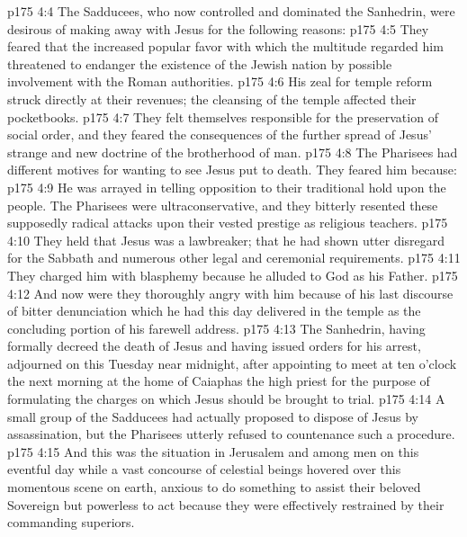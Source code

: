 \vs p175 4:4 The Sadducees, who now controlled and dominated the Sanhedrin, were desirous of making away with Jesus for the following reasons:
\pc \vs p175 4:5 \bibnobreakspace They feared that the increased popular favor with which the multitude regarded him threatened to endanger the existence of the Jewish nation by possible involvement with the Roman authorities.
\pc \vs p175 4:6 \bibnobreakspace His zeal for temple reform struck directly at their revenues; the cleansing of the temple affected their pocketbooks.
\pc \vs p175 4:7 \bibnobreakspace They felt themselves responsible for the preservation of social order, and they feared the consequences of the further spread of Jesus’ strange and new doctrine of the brotherhood of man.
\pc \vs p175 4:8 The Pharisees had different motives for wanting to see Jesus put to death. They feared him because:
\pc \vs p175 4:9 \bibnobreakspace He was arrayed in telling opposition to their traditional hold upon the people. The Pharisees were ultraconservative, and they bitterly resented these supposedly radical attacks upon their vested prestige as religious teachers.
\pc \vs p175 4:10 \bibnobreakspace They held that Jesus was a lawbreaker; that he had shown utter disregard for the Sabbath and numerous other legal and ceremonial requirements.
\pc \vs p175 4:11 \bibnobreakspace They charged him with blasphemy because he alluded to God as his Father.
\pc \vs p175 4:12 \bibnobreakspace And now were they thoroughly angry with him because of his last discourse of bitter denunciation which he had this day delivered in the temple as the concluding portion of his farewell address.
\pc \vs p175 4:13 The Sanhedrin, having formally decreed the death of Jesus and having issued orders for his arrest, adjourned on this Tuesday near midnight, after appointing to meet at ten o’clock the next morning at the home of Caiaphas the high priest for the purpose of formulating the charges on which Jesus should be brought to trial.
\vs p175 4:14 A small group of the Sadducees had actually proposed to dispose of Jesus by assassination, but the Pharisees utterly refused to countenance such a procedure.
\pc \vs p175 4:15 And this was the situation in Jerusalem and among men on this eventful day while a vast concourse of celestial beings hovered over this momentous scene on earth, anxious to do something to assist their beloved Sovereign but powerless to act because they were effectively restrained by their commanding superiors.
